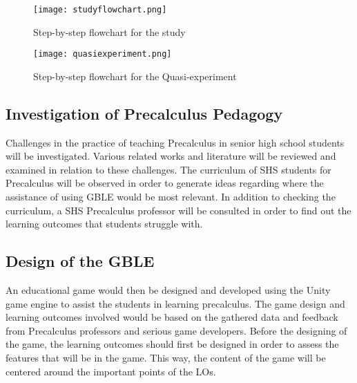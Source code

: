 \begin{figure}[h]
   \centering                    
   \texttt{[image: studyflowchart.png]}
   \caption{Step-by-step flowchart for the study}
    \label{fig:studyflowchart}
\end{figure}

\begin{figure}[h]
   \centering                    
   \texttt{[image: quasiexperiment.png]}
   \caption{Step-by-step flowchart for the Quasi-experiment}
    \label{fig:quasiexperiment}
\end{figure}

\begin{subs}
\subsection{Investigation of Precalculus Pedagogy}
Challenges in the practice of teaching Precalculus in senior high school students will be investigated. Various related works and literature will be reviewed and examined in relation to these challenges. The curriculum of SHS students for Precalculus will be observed in order to generate ideas regarding where the assistance of using GBLE would be most relevant. In addition to checking the curriculum, a SHS Precalculus professor will be consulted in order to find out the learning outcomes that students struggle with.

\subsection{Design of the GBLE}
An educational game would then be designed and developed using the Unity game engine to assist the students in learning precalculus. The game design and learning outcomes involved would be based on the gathered data and feedback from Precalculus professors and serious game developers. Before the designing of the game, the learning outcomes should first be designed in order to assess the features that will be in the game. This way, the content of the game will be centered around the important points of the LOs.


\end{subs}
